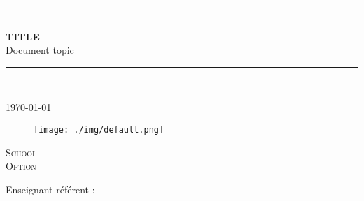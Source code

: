 \newcommand{\HRule}{\rule{\linewidth}{0.5mm}} %

\vspace*{1cm}

\begin{center} %
	\HRule \\[0.2cm] %
	\Large
	\textbf{
		TITLE
		}\\ %
	\vspace{1cm}
Document topic \\

	\large
	\HRule \\[1.5cm] %
	\normalsize
	\author{[AUTOR]}
	\today %
\end{center}

\begin{figure}[h!] %
	\centering
	\texttt{[image: ./img/default.png]}
\end{figure}

\vspace{2cm}

\begin{center}\large %
	\textsc{School}\\
	\textsc{Option}
\end{center}

\vspace{2cm}

\noindent
Enseignant référent : 
\vspace{2cm}
